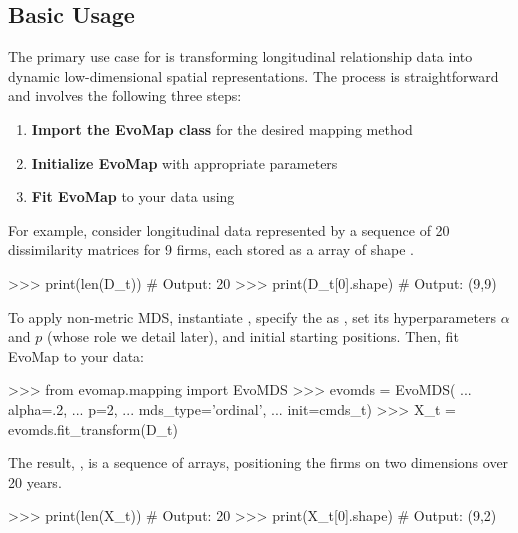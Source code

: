 \documentclass[article]{jss}
\begin{document}
\subsection{Basic Usage} 

The primary use case for  is transforming longitudinal relationship data into dynamic low-dimensional 
spatial representations. The process is straightforward and involves the following three steps:

\begin{enumerate}
  \item \textbf{Import the EvoMap class} for the desired mapping method
  \item \textbf{Initialize EvoMap} with appropriate parameters
  \item \textbf{Fit EvoMap} to your data using 
\end{enumerate}

For example, consider longitudinal data represented by a sequence of 20 dissimilarity matrices for 9 firms, each stored as a
 array of shape .

\begin{CodeChunk}
\begin{CodeInput}
>>> print(len(D_t))       # Output: 20
>>> print(D_t[0].shape)   # Output: (9,9)
\end{CodeInput}
\end{CodeChunk}

To apply non-metric MDS, instantiate , specify the  as , 
set its hyperparameters $\alpha$ and $p$ (whose role we detail later), and initial starting positions. Then, fit 
EvoMap to your data: 

\begin{Code}
>>> from evomap.mapping import EvoMDS   
>>> evomds = EvoMDS(
...     alpha=.2, 
...     p=2, 
...     mds_type='ordinal', 
...     init=cmds_t)                  
>>> X_t = evomds.fit_transform(D_t)  
\end{Code}

The result, , is a sequence of  arrays,  
positioning the firms on two dimensions over 20 years. 

\begin{CodeChunk}
\begin{CodeInput}
>>> print(len(X_t))   # Output: 20
>>> print(X_t[0].shape)   # Output: (9,2)   
\end{CodeInput}
\end{CodeChunk}
\end{document}
